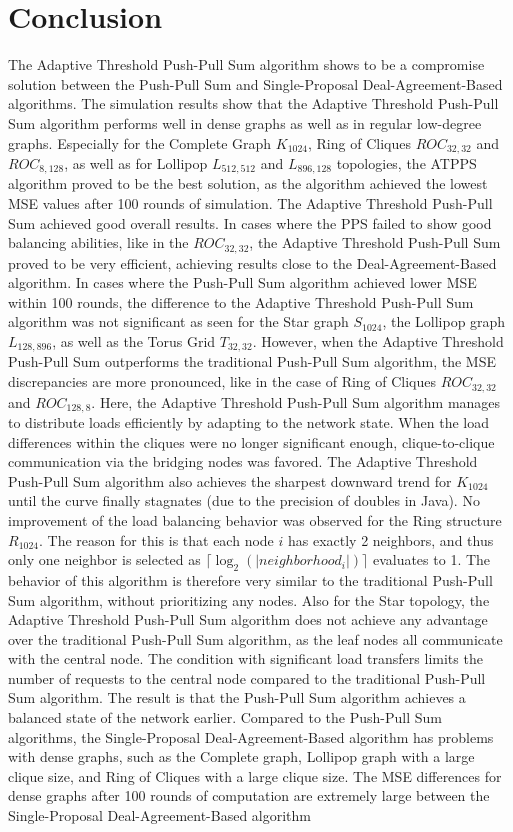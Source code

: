 \chapter{Conclusion}\label{chap:conclusion}
The Adaptive Threshold Push-Pull Sum algorithm shows to be a compromise solution between the Push-Pull Sum and Single-Proposal Deal-Agreement-Based algorithms. The simulation results show that the Adaptive Threshold Push-Pull Sum algorithm performs well in dense graphs as well as in regular low-degree graphs. Especially for the Complete Graph $K_{1024}$, Ring of Cliques $ROC_{32,32}$ and $ROC_{8,128}$, as well as for Lollipop $L_{512,512}$ and $L_{896,128}$ topologies, the ATPPS algorithm proved to be the best solution, as the algorithm achieved the lowest MSE values after 100 rounds of simulation. The Adaptive Threshold Push-Pull Sum achieved good overall results. In cases where the PPS failed to show good balancing abilities, like in the $ROC_{32,32}$, the Adaptive Threshold Push-Pull Sum proved to be very efficient, achieving results close to the Deal-Agreement-Based algorithm. In cases where the Push-Pull Sum algorithm achieved lower MSE within 100 rounds, the difference to the Adaptive Threshold Push-Pull Sum algorithm was not significant as seen for the Star graph $S_{1024}$, the Lollipop graph $L_{128,896}$, as well as the Torus Grid $T_{32,32}$. However, when the Adaptive Threshold Push-Pull Sum outperforms the traditional Push-Pull Sum algorithm, the MSE discrepancies are more pronounced, like in the case of Ring of Cliques $ROC_{32,32}$ and $ROC_{128,8}$. Here, the Adaptive Threshold Push-Pull Sum algorithm manages to distribute loads efficiently by adapting to the network state. When the load differences within the cliques were no longer significant enough, clique-to-clique communication via the bridging nodes was favored. The Adaptive Threshold Push-Pull Sum algorithm also achieves the sharpest downward trend for $K_{1024}$ until the curve finally stagnates (due to the precision of doubles in Java). No improvement of the load balancing behavior was observed for the Ring structure $R_{1024}$. The reason for this is that each node $i$ has exactly 2 neighbors, and thus only one neighbor is selected as $\lceil\log_{2}{(|neighborhood_{i}|)}\rceil$ evaluates to 1. The behavior of this algorithm is therefore very similar to the traditional Push-Pull Sum algorithm, without prioritizing any nodes. Also for the Star topology, the Adaptive Threshold Push-Pull Sum algorithm does not achieve any advantage over the traditional Push-Pull Sum algorithm, as the leaf nodes all communicate with the central node. The condition with significant load transfers limits the number of requests to the central node compared to the traditional Push-Pull Sum algorithm. The result is that the Push-Pull Sum algorithm achieves a balanced state of the network earlier. Compared to the Push-Pull Sum algorithms, the Single-Proposal Deal-Agreement-Based algorithm has problems with dense graphs, such as the Complete graph, Lollipop graph with a large clique size, and Ring of Cliques with a large clique size. The MSE differences for dense graphs after 100 rounds of computation are extremely large between the Single-Proposal Deal-Agreement-Based algorithm 